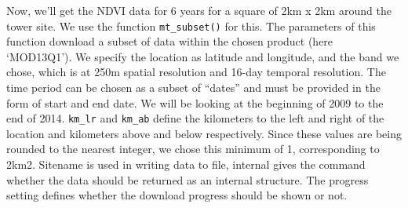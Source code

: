 \documentclass[
]{book}
\newenvironment{Shaded}{\begin{snugshade}}{\end{snugshade}}
\newcommand{\CommentTok}[1]{\textcolor[rgb]{0.56,0.35,0.01}{\textit{#1}}}
\newcommand{\DataTypeTok}[1]{\textcolor[rgb]{0.13,0.29,0.53}{#1}}
\newcommand{\DecValTok}[1]{\textcolor[rgb]{0.00,0.00,0.81}{#1}}
\newcommand{\KeywordTok}[1]{\textcolor[rgb]{0.13,0.29,0.53}{\textbf{#1}}}
\newcommand{\NormalTok}[1]{#1}
\newcommand{\OperatorTok}[1]{\textcolor[rgb]{0.81,0.36,0.00}{\textbf{#1}}}
\newcommand{\OtherTok}[1]{\textcolor[rgb]{0.56,0.35,0.01}{#1}}
\newcommand{\StringTok}[1]{\textcolor[rgb]{0.31,0.60,0.02}{#1}}
\begin{document}
Now, we'll get the NDVI data for 6 years for a square of 2km x 2km around the tower site. We use the function \texttt{mt\_subset()} for this. The parameters of this function download a subset of data within the chosen product (here `MOD13Q1'). We specify the location as latitude and longitude, and the band we chose, which is at 250m spatial resolution and 16-day temporal resolution. The time period can be chosen as a subset of ``dates'' and must be provided in the form of start and end date. We will be looking at the beginning of 2009 to the end of 2014. \texttt{km\_lr} and \texttt{km\_ab} define the kilometers to the left and right of the location and kilometers above and below respectively. Since these values are being rounded to the nearest integer, we chose this minimum of 1, corresponding to 2km2. Sitename is used in writing data to file, internal gives the command whether the data should be returned as an internal structure. The progress setting defines whether the download progress should be shown or not.

\begin{Shaded}
\end{Shaded}
\end{document}

